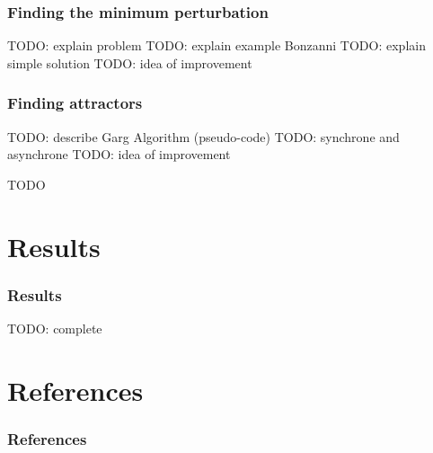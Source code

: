 \documentclass{beamer}
\begin{document}
\begin{frame}
	\frametitle{Finding the minimum perturbation}
	TODO: explain problem
	TODO: explain example Bonzanni
	TODO: explain simple solution
	TODO: idea of improvement
\end{frame}

\begin{frame}
	\frametitle{Finding attractors}
	TODO: describe Garg Algorithm (pseudo-code)
	TODO: synchrone and asynchrone
	TODO: idea of improvement
\end{frame}

\begin{frame}
	TODO 

\end{frame}



\section{Results}

\begin{frame}
  \frametitle{Results}
  TODO: complete
\end{frame}


\section*{References}

\begin{frame}
  \frametitle{References}
  
  
\end{frame}
\end{document}
